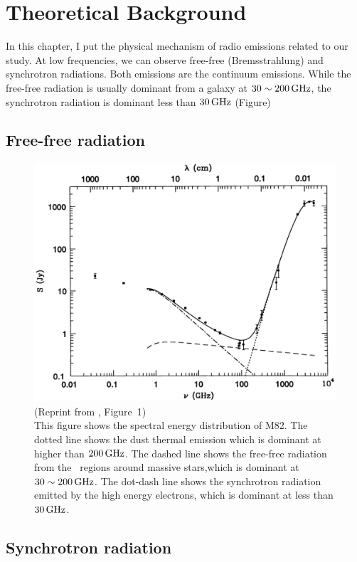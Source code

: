 \chapter{Theoretical Background}\label{chap:theory}
\begin{chapabstract}

    In this chapter, I put the physical mechanism of radio emissions related to our study.
    At low frequencies, we can observe free-free (Bremsstrahlung) and synchrotron radiations.
    Both emissions are the continuum emissions.
    While the free-free radiation is usually dominant from a galaxy at $30 \sim 200\,\mathrm{GHz}$, the synchrotron radiation is dominant less than $30\,\mathrm{GHz}$ (Figure)

\end{chapabstract}



\section{Free-free radiation}

\begin{figure}[htbp]
	\centering
	\includegraphics[width=.7\linewidth]{Chapter_2/Figures/Condon1992_Figure1.png}
    \caption[Reprint from \citet{Condon1992a} (Figure~1)]{\label{fig:Condon1992_figure1}
        (Reprint from \citet{Condon1992a}, Figure~1)\\
        This figure shows the spectral energy distribution of M82.
        The dotted line shows the dust thermal emission which is dominant at higher than $200\,\mathrm{GHz}$.
        The dashed line shows the free-free radiation from the \ih~regions around massive stars,which is dominant at $30 \sim 200\,\mathrm{GHz}$.
        The dot-dash line shows the synchrotron radiation emitted by the high energy electrons, which is dominant at less than $30\,\mathrm{GHz}$.
    }
\end{figure}




















\section{Synchrotron radiation}

